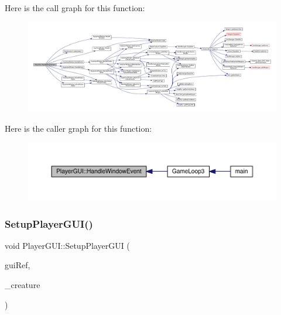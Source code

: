 Here is the call graph for this function\+:
\nopagebreak
\begin{figure}[H]
\begin{center}
\leavevmode
\includegraphics[width=350pt]{db/dcd/class_player_g_u_i_a1658f37b9e537d4a7377ca842bf60598_cgraph}
\end{center}
\end{figure}
Here is the caller graph for this function\+:
\nopagebreak
\begin{figure}[H]
\begin{center}
\leavevmode
\includegraphics[width=350pt]{db/dcd/class_player_g_u_i_a1658f37b9e537d4a7377ca842bf60598_icgraph}
\end{center}
\end{figure}
\mbox{\label{class_player_g_u_i_a7fdc3f6f9478ea077ddaffd8d34a3854}} 
\subsubsection{\texorpdfstring{Setup\+Player\+G\+U\+I()}{SetupPlayerGUI()}}
{\footnotesize\ttfamily void Player\+G\+U\+I\+::\+Setup\+Player\+G\+UI (\begin{DoxyParamCaption}\item[{tgui\+::\+Gui \&}]{gui\+Ref,  }\item[{\mbox{\hyperlink{class_base_creature}{Base\+Creature}} $\ast$}]{\+\_\+creature }\end{DoxyParamCaption})}

